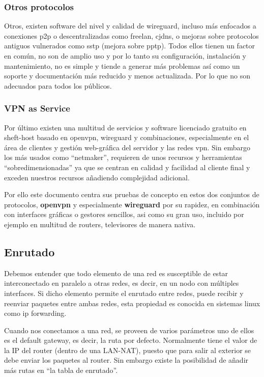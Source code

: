 \subsubsection{Otros protocolos}
Otros, existen software del nivel y calidad de wireguard, incluso más enfocados a conexiones p2p o descentralizadas como freelan, cjdns, o mejoras sobre protocolos antiguos vulnerados como sstp (mejora sobre pptp). Todos ellos tienen un factor en común, no son de amplio uso y por lo tanto su configuración, instalación y mantenimiento, no es simple y tiende a generar más problemas así como un soporte y documentación más reducido y menos actualizada. Por lo que no son adecuados para todos los públicos.

\subsubsection{VPN as Service}
Por último existen una multitud de servicios y software licenciado gratuito en sheft-host basado en openvpn, wireguard y combinaciones, especialmente en el área de clientes y gestión web-gráfica del servidor y las redes vpn. Sin embargo los más usados como “netmaker”\cite{c_netmaker}, requieren de unos recursos y herramientas “sobredimensionadas” ya que se centran en calidad y facilidad al cliente final y exceden nuestros recursos añadiendo complejidad adicional.

Por ello este documento centra sus pruebas de concepto en estos dos conjuntos de protocolos, \textbf{openvpn} y especialmente \textbf{wireguard} por su rapidez, en combinación con interfaces gráficas o gestores sencillos, asi como su gran uso, incluido por ejemplo en multitud de routers, televisores de manera nativa.

\subsection{Enrutado}\label{S:enrutado_sedes}
Debemos entender que todo elemento de una red es susceptible de estar interconectado en paralelo a otras redes, es decir, en un nodo con múltiples interfaces. Si dicho elemento permite el enrutado entre redes, puede recibir y reenviar paquetes entre ambas redes, esta propiedad es conocida en sistemas linux como ip forwarding.

Cuando nos conectamos a una red, se proveen de varios parámetros uno de ellos es el default gateway, es decir, la ruta por defecto. Normalmente tiene el valor de la IP del router (dentro de una LAN-NAT), puesto que para salir al exterior se debe enviar los paquetes al router. Sin embargo existe la posibilidad de añadir más rutas en “la tabla de enrutado”. 

